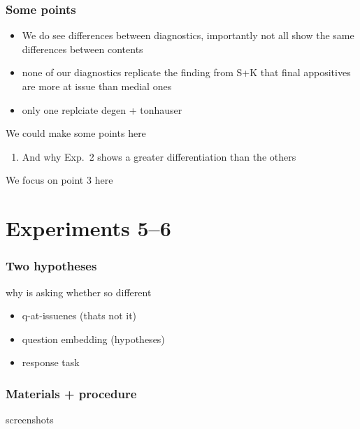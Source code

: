 \documentclass[compress, xcolor = dvipsnames, aspectratio=169]{beamer}
\begin{document}
	\begin{frame}[t]\frametitle{Some points}
		\begin{itemize}
			\item We do see differences between diagnostics, importantly not all show the same differences between contents 
			\item none of our diagnostics replicate the finding from S+K that final appositives are more at issue than medial ones
			\item only one replciate degen + tonhauser
		\end{itemize}	

		We could make some points here
		\begin{enumerate}
			\item And why Exp.~2 shows a greater differentiation than the others
		\end{enumerate}
		
		We focus on point 3 here
	
	\end{frame}

\section{Experiments 5--6}
	\begin{frame}[t]\frametitle{Two hypotheses}
		why is asking whether so different
		\begin{itemize}
			\item q-at-issuenes (thats not it)
			\item question embedding  (hypotheses)
			\item response task
			
		\end{itemize}
	
	\end{frame}

	\begin{frame}[t]\frametitle{Materials + procedure}
	
		screenshots
	
	\end{frame}
\end{document}

